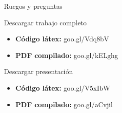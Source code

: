 \begin{frame}
	\centering \LARGE \color{naranjaUCA} Ruegos y preguntas
\end{frame}
\begin{frame}
	\begin{block}{Descargar trabajo completo}
		\begin{itemize}
			\item \textbf{Código látex: } goo.gl/Vdq8bV
			\item \textbf{PDF compilado: } goo.gl/kELghg
		\end{itemize}
	\end{block}
	\begin{block}{Descargar presentación}
			\begin{itemize}
				\item \textbf{Código látex: } goo.gl/V5xIbW
				\item \textbf{PDF compilado: } goo.gl/aCvjil
			\end{itemize}
	\end{block}
\end{frame}